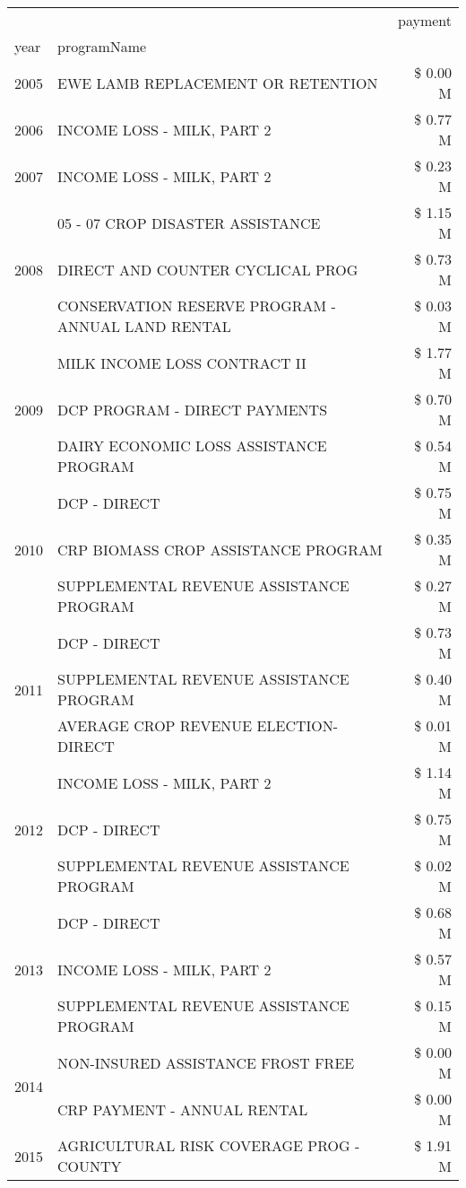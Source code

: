 \begin{tabular}{llr}
\toprule
 &  & payment \\
year & programName &  \\
\midrule
2005 & EWE LAMB REPLACEMENT OR RETENTION & \$ 0.00 M \\
\cline{1-3}
2006 & INCOME LOSS - MILK, PART 2 & \$ 0.77 M \\
\cline{1-3}
2007 & INCOME LOSS - MILK, PART 2 & \$ 0.23 M \\
\cline{1-3}
\multirow[t]{3}{*}{2008} & 05 - 07 CROP DISASTER ASSISTANCE & \$ 1.15 M \\
 & DIRECT AND COUNTER CYCLICAL PROG & \$ 0.73 M \\
 & CONSERVATION RESERVE PROGRAM - ANNUAL LAND RENTAL & \$ 0.03 M \\
\cline{1-3}
\multirow[t]{3}{*}{2009} & MILK INCOME LOSS CONTRACT II & \$ 1.77 M \\
 & DCP PROGRAM - DIRECT PAYMENTS & \$ 0.70 M \\
 & DAIRY ECONOMIC LOSS ASSISTANCE PROGRAM & \$ 0.54 M \\
\cline{1-3}
\multirow[t]{3}{*}{2010} & DCP - DIRECT & \$ 0.75 M \\
 & CRP BIOMASS CROP ASSISTANCE PROGRAM & \$ 0.35 M \\
 & SUPPLEMENTAL REVENUE ASSISTANCE PROGRAM & \$ 0.27 M \\
\cline{1-3}
\multirow[t]{3}{*}{2011} & DCP - DIRECT & \$ 0.73 M \\
 & SUPPLEMENTAL REVENUE ASSISTANCE PROGRAM & \$ 0.40 M \\
 & AVERAGE CROP REVENUE ELECTION-DIRECT & \$ 0.01 M \\
\cline{1-3}
\multirow[t]{3}{*}{2012} & INCOME LOSS - MILK, PART 2 & \$ 1.14 M \\
 & DCP - DIRECT & \$ 0.75 M \\
 & SUPPLEMENTAL REVENUE ASSISTANCE PROGRAM & \$ 0.02 M \\
\cline{1-3}
\multirow[t]{3}{*}{2013} & DCP - DIRECT & \$ 0.68 M \\
 & INCOME LOSS - MILK, PART 2 & \$ 0.57 M \\
 & SUPPLEMENTAL REVENUE ASSISTANCE PROGRAM & \$ 0.15 M \\
\cline{1-3}
\multirow[t]{2}{*}{2014} & NON-INSURED ASSISTANCE FROST FREE & \$ 0.00 M \\
 & CRP PAYMENT - ANNUAL RENTAL & \$ 0.00 M \\
\cline{1-3}
\multirow[t]{2}{*}{2015} & AGRICULTURAL RISK COVERAGE PROG - COUNTY & \$ 1.91 M \\

\end{tabular}
